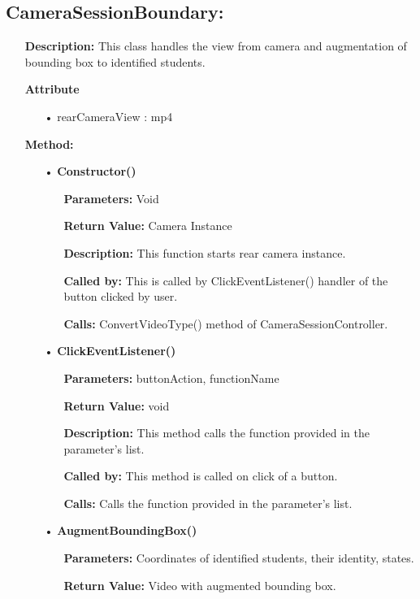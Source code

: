 \documentclass{scrreprt}
\begin{document}
\subsection{CameraSessionBoundary:}
\begin{enumerate}
\item[] \textbf{Description:} This class handles the view from camera and augmentation of bounding box to identified students.
\item[] \textbf{Attribute}
\begin{itemize}
\item [•]rearCameraView : mp4
\end{itemize}
\item[] \textbf{Method:}
\begin{itemize}
\item [•] \textbf{Constructor()}
\begin{itemize}
\item [] \textbf{Parameters:} Void 
\item [] \textbf{Return Value:} Camera Instance
\item [] \textbf{Description:} This function starts rear camera instance. 
\item [] \textbf{Called by:} This is called by ClickEventListener() handler of the button clicked by user.  
\item [] \textbf{Calls:} ConvertVideoType() method of CameraSessionController.
\end{itemize}
\item [•] \textbf{ClickEventListener()}
\begin{itemize}
\item [] \textbf{Parameters:} buttonAction, functionName 
\item [] \textbf{Return Value:} void
\item [] \textbf{Description:} This method calls the function provided in the parameter's list.
\item [] \textbf{Called by:} This method is called on click of a button.
\item [] \textbf{Calls:} Calls the function provided in the parameter's list.  
\end{itemize}
\item [•] \textbf{AugmentBoundingBox()}
\begin{itemize}
\item [] \textbf{Parameters:} Coordinates of identified students, their identity, states. 
\item [] \textbf{Return Value:} Video with augmented bounding box.

\end{itemize}
\end{itemize}
\end{enumerate}
\end{document}
